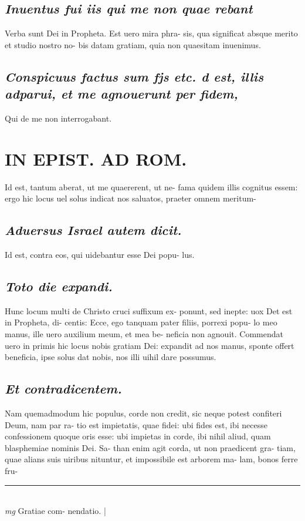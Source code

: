 \documentclass{article}
\begin{document}
\begin{pages}
\subsection*{\textit{Inuentus fui iis qui me non quae rebant }}\pstart Verba sunt Dei in Propheta. Est uero mira phra- sis, qua significat absque merito et studio nostro no- bis datam gratiam, quia non quaesitam inuenimus.  \pend
{}
{}
\subsection*{\textit{Conspicuus factus sum fjs etc. d est, illis adparui, et me agnouerunt per fidem, }}\pstart Qui de me non interrogabant.  \pend
\section*{IN EPIST. AD ROM.  }
\marginpar{[ p.124 ]}\pstart Id est, tantum aberat, ut me quaererent, ut ne- fama quidem illis cognitus essem: ergo hic locus uel solus indicat nos saluatos, praeter omnem meritum-  \pend
{}
{}
\subsection*{\textit{Aduersus Israel autem dicit. }}\pstart Id est, contra eos, qui uidebantur esse Dei popu- lus.   \pend
{}
{}
\subsection*{\textit{Toto die expandi. }}\pstart Hunc locum multi de Christo cruci suffixum ex- ponunt, sed inepte: uox Det est in Propheta, di- centis: Ecce, ego tanquam pater filiis, porrexi popu- lo meo manus, ille uero auxilium meum, et mea be- neficia non agnouit. Commendat uero in primis hic locus nobis gratiam Dei: expandit ad nos manus, sponte offert beneficia, ipse solus dat nobis, nos illi uihil dare possumus.   \pend
{}
{}
\subsection*{\textit{Et contradicentem. }}\pstart Nam quemadmodum hic populus, corde non credit, sic neque potest confiteri Deum, nam par ra- tio est impietatis, quae fidei: ubi fides est, ibi necesse confessionem quoque oris esse: ubi impietas in corde, ibi nihil aliud, quam blasphemiae nominis Dei. Sa- than enim agit corda, ut non praedicent gra- tiam, quae alians suis uiribus nituntur, et impossibile est arborem ma- lam, bonos ferre fru-  \pend
\vspace{0.5cm}\noindent
\vspace{0.2cm}\rule{1cm}{0.2pt}\\ 
\hspace{0.2cm}\textit{mg}
\footnotesize Gratiae com- nendatio.  
\normalsize| 

\end{pages}
\end{document}
